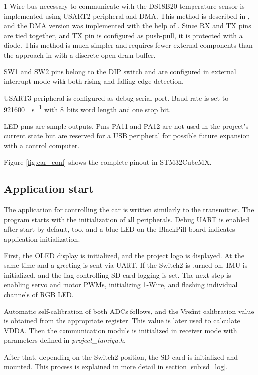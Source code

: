 1-Wire bus necessary to communicate with the DS18B20 temperature sensor is implemented using USART2 peripheral and DMA. This method is described in \cite{1wire_uart}, and the DMA version was implemented with the help of \cite{1wire_uart_imp}. Since RX and TX pins are tied together, and TX pin is configured as push-pull, it is protected with a diode. This method is much simpler and requires fewer external components than the approach in \cite{1wire_uart} with a discrete open-drain buffer.

SW1 and SW2 pins belong to the DIP switch and are configured in external interrupt mode with both rising and falling edge detection.

USART3 peripheral is configured as debug serial port. Baud rate is set to \SI{921600}{\bit\per\second} with 8~bits word length and one stop bit.

LED pins are simple outputs. Pins PA11 and PA12 are not used in the project's current state but are reserved for a USB peripheral for possible future expansion with a control computer.

Figure \ref{fig:car_conf} shows the complete pinout in STM32CubeMX.

\subsection{Application start}
The application for controlling the car is written similarly to the transmitter. The program starts with the initialization of all peripherals. Debug UART is enabled after start by default, too, and a blue LED on the BlackPill board indicates application initialization.

First, the OLED display is initialized, and the project logo is displayed. At the same time and a greeting is sent via UART. If the Switch2 is turned on, IMU is initialized, and the flag controlling SD card logging is set. The next step is enabling servo and motor PWMs, initializing 1-Wire, and flashing individual channels of RGB LED.

Automatic self-calibration of both ADCs follows, and the Vrefint calibration value is obtained from the appropriate register. This value is later used to calculate VDDA. Then the communication module is initialized in receiver mode with parameters defined in \textit{project\_tamiya.h}.

After that, depending on the Switch2 position, the SD card is initialized and mounted. This process is explained in more detail in section \ref{sub:sd_log}.


